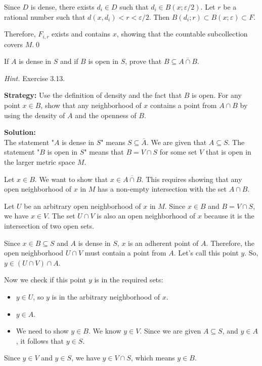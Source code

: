 Since $D$ is dense, there exists $d_i \in D$ such that $d_i \in B(x;\varepsilon/2)$. Let $r$ be a rational number such that $d(x,d_i) < r < \varepsilon/2$. Then $B(d_i;r) \subset B(x;\varepsilon) \subset F$.

Therefore, $F_{i,r}$ exists and contains $x$, showing that the countable subcollection covers $M$.\qed


\begin{problembox}
If \( A \) is dense in \( S \) and if \( B \) is open in \( S \), prove that \( B \subseteq \overline{A \cap B} \).

\textit{Hint.} Exercise 3.13.
\end{problembox}

\noindent\textbf{Strategy:} Use the definition of density and the fact that $B$ is open. For any point $x \in B$, show that any neighborhood of $x$ contains a point from $A \cap B$ by using the density of $A$ and the openness of $B$.

\bigskip\noindent\textbf{Solution:}\\
The statement "$A$ is dense in $S$" means $S \subseteq \overline{A}$. We are given that $A \subseteq S$.
The statement "$B$ is open in $S$" means that $B = V \cap S$ for some set $V$ that is open in the larger metric space $M$.

Let $x \in B$. We want to show that $x \in \overline{A \cap B}$. This requires showing that any open neighborhood of $x$ in $M$ has a non-empty intersection with the set $A \cap B$.

Let $U$ be an arbitrary open neighborhood of $x$ in $M$.
Since $x \in B$ and $B = V \cap S$, we have $x \in V$.
The set $U \cap V$ is also an open neighborhood of $x$ because it is the intersection of two open sets.

Since $x \in B \subseteq S$ and $A$ is dense in $S$, $x$ is an adherent point of $A$. Therefore, the open neighborhood $U \cap V$ must contain a point from $A$. Let's call this point $y$.
So, $y \in (U \cap V) \cap A$.

Now we check if this point $y$ is in the required sets:
\begin{itemize}
    \item $y \in U$, so $y$ is in the arbitrary neighborhood of $x$.
    \item $y \in A$.
    \item We need to show $y \in B$. We know $y \in V$. Since we are given $A \subseteq S$, and $y \in A$, it follows that $y \in S$.
\end{itemize}
Since $y \in V$ and $y \in S$, we have $y \in V \cap S$, which means $y \in B$.

